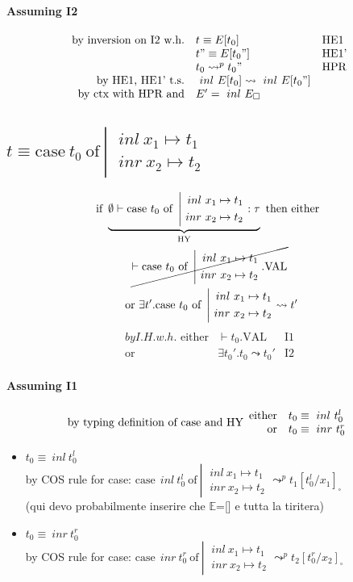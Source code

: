 \documentclass{article}
\newcommand{\inl}[0]{\ensuremath{\ inl\ }}
\newcommand{\inr}[0]{\ensuremath{\ inr\ }}
\newcommand{\case}[3]{\ensuremath{\text{case}\ #1\ \text{of}\ \left|\begin{aligned}#2\\#3\end{aligned}\right.}}
\newcommand{\mE}[0]{\ensuremath{\mathbb{E}}}
\begin{document}
\paragraph{Assuming I2}
\[
    \begin{array}{rl @{\quad} l}
        \text{by inversion on I2 w.h.}   &  t \equiv E[t_0]         & \text{HE1}\\
                                         &  t" \equiv E[t_0"]        & \text{HE1'}\\
                                         &  t_0 \leadsto^p t_0"     & \text{HPR}\\
        \text{by HE1, HE1' t.s.}         &  \inl E[t_0] \leadsto \inl E[t_0"] \\
        \text{by ctx with HPR and}       &  E' = \inl E _\square \\
    \end{array}
\]

\subsection{$t \equiv \case{t_0}{\inl x_1 \mapsto t_1}{\inr x_2 \mapsto t_2}$}
\begin{multline*}
    \text{if } \underbrace{\emptyset \vdash \case{t_0}{\inl x_1 \mapsto t_1}{\inr x_2 \mapsto t_2}:\tau}_\text{HY} \text{ then either } \\ \cancel{ \vdash \case{t_0}{\inl x_1 \mapsto t_1}{\inr x_2 \mapsto t_2}.\text{VAL} } \\ \text{ or } \exists t'.\case{t_0}{\inl x_1 \mapsto t_1}{\inr x_2 \mapsto t_2}\leadsto t'
\end{multline*} 
\begin{align*}
    by I.H. w.h. \text{ either} & \vdash t_0.\text{VAL} & \text{I1}\\
    \text{or}                   & \exists t_0'.t_0\leadsto t_0' & \text{I2}
\end{align*}

\paragraph{Assuming I1}
\begin{equation*}
    \text{by typing definition of case and HY}\begin{array}{r@{\quad}l} 
        \text{either} & t_0 \equiv \inl t_0^l \\
        \text{or}     & t_0 \equiv \inr t_0^r
    \end{array}
\end{equation*}
\begin{itemize}
    \item $t_0\equiv\inl t_0^l$ \\
        by COS rule for case: $\case{\inl t_0^l}{\inl x_1 \mapsto t_1}{\inr x_2 \mapsto t_2} \leadsto^p t_1[t_0^l/x_1]_\square$ \\
        (qui devo probabilmente inserire che \mE=[] e tutta la tiritera)
    \item $t_0\equiv\inr t_0^r$ \\
        by COS rule for case: $\case{\inr t_0^r}{\inl x_1 \mapsto t_1}{\inr x_2 \mapsto t_2} \leadsto^p t_2[t_0^r/x_2]_\square$
\end{itemize}
\end{document}
